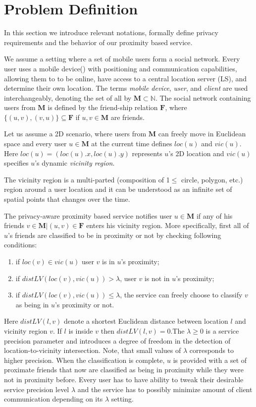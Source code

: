 \section{Problem Definition}\label{sec:problemdef}

In this section we introduce relevant notations, formally define privacy
requirements and the behavior of our proximity based service.

We assume a setting where a set of mobile users form a social network. Every user
uses a mobile device(\mdns) with positioning and communication capabilities, allowing 
them to to be online, have access to a central location server (LS), and determine their own 
location. The terms \textit{mobile device}, \textit{user}, and \textit{client} 
are used interchangeably, denoting the set of all \mds by $\mathbf{M} \subset \mathbb{N}$. 
The social network containing users from $\mathbf{M}$ is defined by the friend-ship 
relation $\mathbf{F}$, where $\{(u,v), (v,u)\} \subseteq \mathbf{F}$ if $u,v \in \mathbf{M}$ 
are friends. 

Let us assume a 2D scenario, where users from $\mathbf{M}$ can freely move in
Euclidean space and every user $u \in \mathbf{M}$ at the current time
defines $loc(u)$ and $vic(u)$. Here $loc(u)=(loc(u).x, loc(u).y)$ represents
$u$'s 2D location and $vic(u)$ specifies $u$'s dynamic \textit{vicinity region}.

The vicinity region is a multi-parted
(composition of 1$\leq$ circle, polygon, etc.) region around a user
location and it can be understood as an infinite set of spatial points that
changes over the time. 


The privacy-aware proximity based service notifies user $u \in \mathbf{M}$ if
any of his friends $v \in \mathbf{M} | (u, v) \in \mathbf{F}$ enters his
vicinity region. More specifically, first all of $u$'s friends are classified to
be in proximity or not by checking following conditions:
\begin{enumerate}
    \item if $loc(v) \in vic(u)$ user $v$ is in $u$'s proximity;
    \item if $distLV(loc(v),vic(u)) > \lambda$, user $v$ is not in $u$'s
proximity;
    \item if $distLV(loc(v),vic(u)) \leq \lambda$, the service can freely choose
to classify $v$ as being in $u$'s proximity or not.
\end{enumerate}
Here $distLV(l,v)$ denote a shortest Euclidean distance between location $l$ and
vicinity region $v$. If $l$ is inside $v$ then $distLV(l,v) = 0$.The $\lambda
\geq 0$ is a service precision parameter and introduces a degree of freedom in
the detection of location-to-vicinity intersection. Note, that small values of
$\lambda$ corresponds to higher precision. When the classification is complete,
$u$ is provided with a set of proximate friends that now are classified as
being in proximity while they were not in proximity before.
Every user has to have ability to tweak their desirable service precision level
$\lambda$ and the service has to possibly minimize amount of client
communication depending on its $\lambda$ setting.

